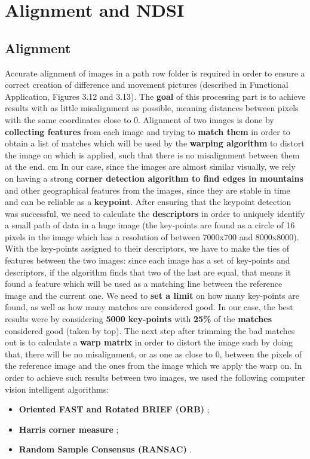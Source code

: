\documentclass[12pt, a4paper]{report}
\begin{document}
	\section{Alignment and NDSI}
	
	\subsection{Alignment}
	Accurate alignment of images in a path row folder is required in order to ensure a correct creation of difference and movement pictures (described in Functional Application, Figures 3.12 and 3.13). The \textbf{goal} of this processing part is to achieve results with as little misalignment as possible, meaning distances between pixels with the same coordinates close to 0. Alignment of two images is done by \textbf{collecting features} from each image and trying to \textbf{match them} in order to obtain a list of matches which will be used by the \textbf{warping algorithm} to distort the image on which is applied, such that there is no misalignment between them at the end. 
	 cm
	In our case, since the images are almost similar visually, we rely on having a strong \textbf{corner detection algorithm to find edges in mountains} and other geographical features from the images, since they are stable in time and can be reliable as a \textbf{keypoint}. After ensuring that the keypoint detection was successful, we need to calculate the \textbf{descriptors} in order to uniquely identify a small path of data in a huge image (the key-points are found as a circle of 16 pixels in the image which has a resolution of between 7000x700 and 8000x8000). With the key-points assigned to their descriptors, we have to make the ties of features between the two images: since each image has a set of key-points and descriptors, if the algorithm finds that two of the last are equal, that means it found a feature which will be used as a matching line between the reference image and the current one. We need to \textbf{set a limit} on how many key-points are found, as well as how many matches are considered good. In our case, the best results were by considering \textbf{5000 key-points} with \textbf{25\%} of the \textbf{matches} considered good (taken by top). The next step after trimming the bad matches out is to calculate a \textbf{warp matrix} in order to distort the image such by doing that, there will be no misalignment, or as one as close to 0, between the pixels of the reference image and the ones from the image which we apply the warp on. 
	\vskip 0.2cm
	In order to achieve such results between two images, we used the following computer vision intelligent algorithms:
	\begin{itemize}
		\item \textbf{Oriented FAST and Rotated BRIEF (ORB)} \cite{orb_1};
		\item \textbf{Harris corner measure} \cite{harris_1};
		\item \textbf{Random Sample Consensus (RANSAC)} \cite{ransac_1}.
	\end{itemize}
	
\end{document}
